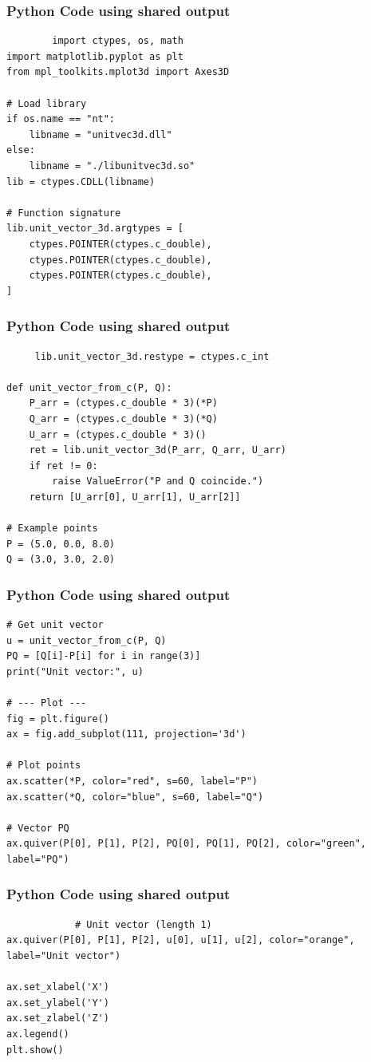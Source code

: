 \documentclass{beamer}
\begin{document}
\begin{frame}[fragile]
	\frametitle{Python Code using shared output}
	\begin{lstlisting}
		import ctypes, os, math
import matplotlib.pyplot as plt
from mpl_toolkits.mplot3d import Axes3D

# Load library
if os.name == "nt":
    libname = "unitvec3d.dll"
else:
    libname = "./libunitvec3d.so"
lib = ctypes.CDLL(libname)

# Function signature
lib.unit_vector_3d.argtypes = [
    ctypes.POINTER(ctypes.c_double),
    ctypes.POINTER(ctypes.c_double),
    ctypes.POINTER(ctypes.c_double),
]
	\end{lstlisting}
\end{frame}
\begin{frame}[fragile]
	\frametitle{Python Code using shared output}
	\begin{lstlisting}	
     lib.unit_vector_3d.restype = ctypes.c_int

def unit_vector_from_c(P, Q):
    P_arr = (ctypes.c_double * 3)(*P)
    Q_arr = (ctypes.c_double * 3)(*Q)
    U_arr = (ctypes.c_double * 3)()
    ret = lib.unit_vector_3d(P_arr, Q_arr, U_arr)
    if ret != 0:
        raise ValueError("P and Q coincide.")
    return [U_arr[0], U_arr[1], U_arr[2]]

# Example points
P = (5.0, 0.0, 8.0)
Q = (3.0, 3.0, 2.0)

	\end{lstlisting}
\end{frame}
\begin{frame}[fragile]
	\frametitle{Python Code using shared output}
	\begin{lstlisting}
# Get unit vector
u = unit_vector_from_c(P, Q)
PQ = [Q[i]-P[i] for i in range(3)]
print("Unit vector:", u)

# --- Plot ---
fig = plt.figure()
ax = fig.add_subplot(111, projection='3d')

# Plot points
ax.scatter(*P, color="red", s=60, label="P")
ax.scatter(*Q, color="blue", s=60, label="Q")

# Vector PQ
ax.quiver(P[0], P[1], P[2], PQ[0], PQ[1], PQ[2], color="green", label="PQ")

	\end{lstlisting}
\end{frame}
\begin{frame}[fragile]
        \frametitle{Python Code using shared output}
        \begin{lstlisting}
            # Unit vector (length 1)
ax.quiver(P[0], P[1], P[2], u[0], u[1], u[2], color="orange", label="Unit vector")

ax.set_xlabel('X')
ax.set_ylabel('Y')
ax.set_zlabel('Z')
ax.legend()
plt.show()
        \end{lstlisting}
\end{frame}
\end{document}
